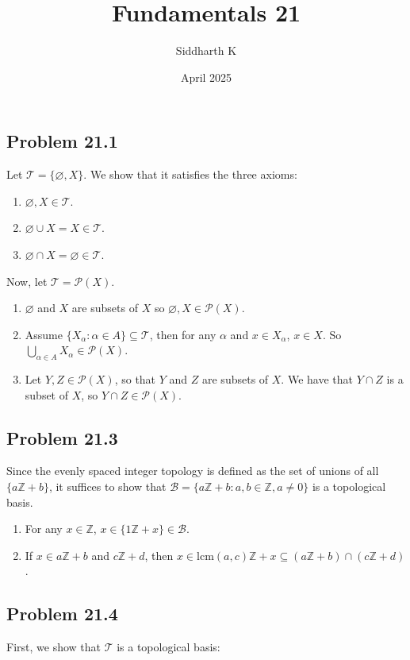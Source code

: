 \documentclass{article}
\title{Fundamentals 21}
\author{Siddharth K}
\date{April 2025}
\newcommand{\Z}{\mathbb{Z}}
\newcommand{\power}{\mathcal{P}}
\newcommand{\T}{\mathcal{T}}
\newcommand{\B}{\mathcal{B}}
\newcommand{\nullset}{\varnothing}
\begin{document}
\maketitle

\subsection*{Problem 21.1}
Let $\T = \{\nullset, X\}$. We show that it satisfies the three axioms:
\begin{enumerate}
    \item $\nullset, X \in \T$.
    \item $\nullset \cup X = X \in \T$.
    \item $\nullset \cap X = \nullset \in \T$.
\end{enumerate}
Now, let $\T = \power(X)$.
\begin{enumerate}
    \item $\nullset$ and $X$ are subsets of $X$ so $\nullset, X \in \power(X)$.
    \item Assume $\{X_\alpha: \alpha \in A\} \subseteq \T$, then for any $\alpha$ and $x \in X_\alpha$, $x \in X$. So $\bigcup_{\alpha \in A} X_\alpha \in \power(X)$.
    \item Let $Y, Z \in \power(X)$, so that $Y$ and $Z$ are subsets of $X$. We have that $Y \cap Z$ is a subset of $X$, so $Y\cap Z \in \power(X)$.
\end{enumerate}

\subsection*{Problem 21.3}
Since the evenly spaced integer topology is defined as the set of unions of all $\{a\Z + b\}$, it suffices to show that $\B = \{a\Z + b : a, b \in \Z, a \neq 0\}$ is a topological basis.

\begin{enumerate}
    \item For any $x \in \Z$, $x \in \{1\Z + x\} \in \B$.
    \item If $x \in a\Z + b$ and $c\Z + d$, then $x \in \text{lcm}(a, c)\Z + x \subseteq (a\Z + b) \cap (c\Z + d)$.
\end{enumerate}

\subsection*{Problem 21.4}
First, we show that $\T$ is a topological basis:
\end{document}
